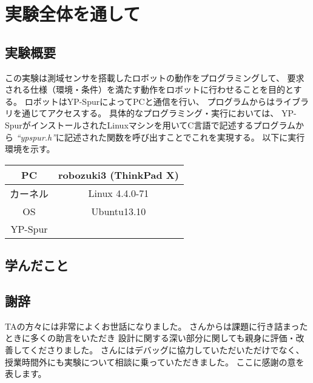 \documentclass[main]{subfiles}
\begin{document}
\chapter{実験全体を通して}
\section{実験概要}
この実験は測域センサを搭載したロボットの動作をプログラミングして、
要求される仕様（環境・条件）を満たす動作をロボットに行わせることを目的とする。
ロボットはYP-SpurによってPCと通信を行い、
プログラムからはライブラリを通じてアクセスする。
具体的なプログラミング・実行においては、
YP-SpurがインストールされたLinuxマシンを用いてC言語で記述するプログラムから
\textit{``ypspur.h''}に記述された関数を呼び出すことでこれを実現する。
以下に実行環境を示す。

\begin{table}[H]
	\centering
	\begin{tabular}{|c|c|}
		\hline
		PC & robozuki3 (ThinkPad X)  \\\hline
		カーネル & Linux 4.4.0-71\\\hline
		OS & Ubuntu13.10\\\hline
		YP-Spur & \\\hline
	\end{tabular}
\end{table}

\section{学んだこと}

\section{謝辞}
TAの方々には非常によくお世話になりました。
\TAa さんからは課題に行き詰まったときに多くの助言をいただき
設計に関する深い部分に関しても親身に評価・改善してくださりました。
\TAb さんにはデバッグに協力していただいただけでなく、
授業時間外にも実験について相談に乗っていただきました。
ここに感謝の意を表します。
\end{document}
